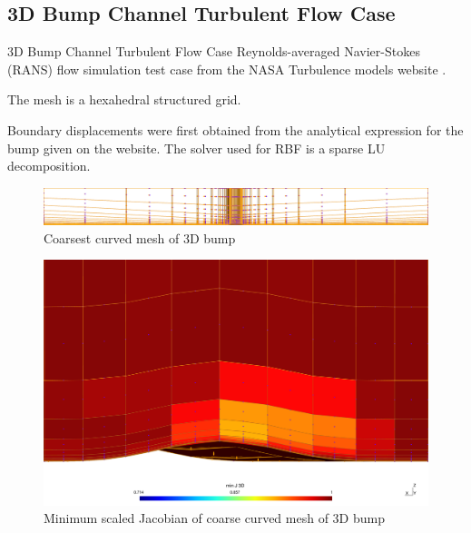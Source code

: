 \documentclass[t,12pt]{beamer}
\begin{document}
\subsection{3D Bump Channel Turbulent Flow Case}
\begin{frame}{3D Bump Channel Turbulent Flow Case}
Reynolds-averaged Navier-Stokes (RANS) flow simulation test case from the NASA Turbulence models website \cite{case:bump3d}.

The mesh is a hexahedral structured grid.

Boundary displacements were first obtained from the analytical expression for the bump given on the website. The solver used for RBF is a sparse LU decomposition.
\begin{figure}
	\centering
	\includegraphics[scale=0.2]{bump3d-vcoarse2}
	\caption{Coarsest curved mesh of 3D bump}
	\label{fig:bump3d}
\end{figure}
\end{frame}

\begin{frame}
	\begin{figure}
		\centering
		\includegraphics[scale=0.2]{bump3d-vcoarse-quality}
		\caption{Minimum scaled Jacobian of coarse curved mesh of 3D bump}
		\label{fig:bump3d-coarse-jac}
	\end{figure}
\end{frame}
\end{document}
